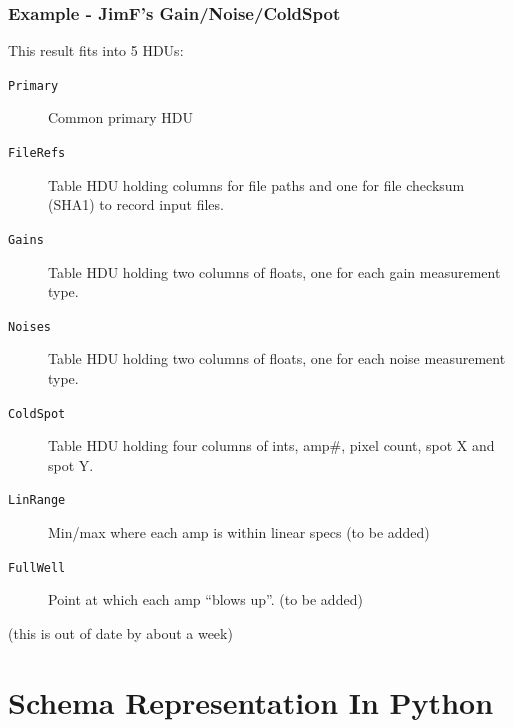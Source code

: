 \documentclass[xcolor=dvipsnames]{beamer}
\begin{document}
\begin{frame}
  \frametitle{Example - JimF's Gain/Noise/ColdSpot}
  This result fits into 5 HDUs:
  \begin{description}
  \item[\texttt{Primary}] Common primary HDU
  \item[\texttt{FileRefs}] Table HDU holding columns for file paths and
    one for file checksum (SHA1) to record input files.
  \item[\texttt{Gains}] Table HDU holding two columns of floats, one
    for each gain measurement type.
  \item[\texttt{Noises}] Table HDU holding two columns of floats, one
    for each noise measurement type.
  \item[\texttt{ColdSpot}] Table HDU holding four columns of ints,
    amp\#, pixel count, spot X and spot Y.
  \item[\texttt{LinRange}] Min/max where each amp is within linear
    specs (to be added)
  \item[\texttt{FullWell}] Point at which each amp ``blows up''. (to
    be added)
  \end{description}

  \vspace{5mm}

  \tiny
  (this is out of date by about a week)

\end{frame}


\section{Schema Representation In Python}
\end{document}
